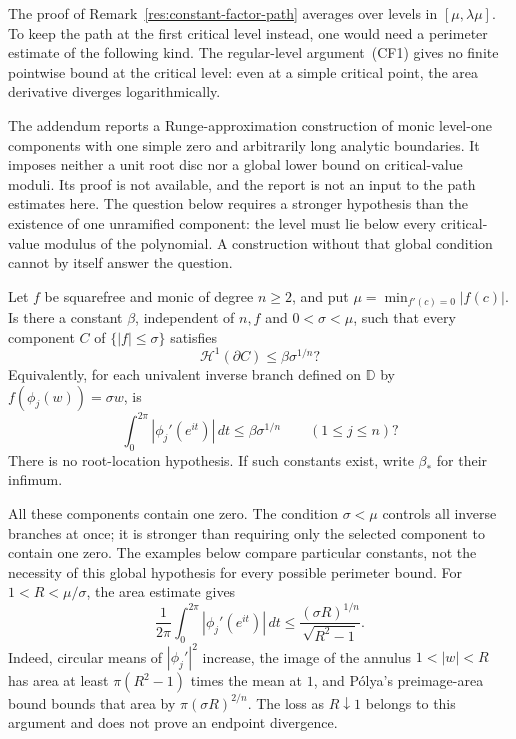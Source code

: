 \documentclass[11pt]{article}
\begin{document}
The proof of Remark~\ref{res:constant-factor-path} averages over
levels in $[\mu,\lambda\mu]$. To keep the path at the first critical
level instead, one would need a perimeter estimate of the following kind.
The regular-level argument~(CF1) gives no finite pointwise bound at the
critical level: even at a simple critical point, the area derivative
diverges logarithmically.

The addendum \cite[Proposition~2]{revision2026} reports a
Runge-approximation construction of monic level-one components with one
simple zero and arbitrarily long analytic boundaries. It imposes neither
a unit root disc nor a global lower bound on critical-value moduli.
Its proof is not available, and
the report is not an input to the path estimates here. The question below
requires a stronger hypothesis than the existence of one unramified
component: the level must lie below every critical-value modulus of the
polynomial. A construction without that global condition cannot by itself
answer the question.

\begin{problem}\label{prob:conjecture-p}
Let $f$ be squarefree and monic of degree $n\ge2$, and put
$\mu=\min_{f'(c)=0}|f(c)|$.  Is there a constant $\beta$, independent of
$n,f$ and $0<\sigma<\mu$, such that every component $C$ of
$\{|f|\le\sigma\}$ satisfies
\[
 \mathcal H^1(\partial C)\le\beta\sigma^{1/n}?
\]
Equivalently, for each univalent inverse branch defined on $\mathbb D$
by $f(\phi_j(w))=\sigma w$, is
\[
 \int_0^{2\pi}|\phi_j'(e^{it})|\,dt\le\beta\sigma^{1/n}
 \qquad(1\le j\le n)?
\]
There is no root-location hypothesis.  If such constants exist, write
$\beta_*$ for their infimum.
\end{problem}
All these components contain one zero. The condition $\sigma<\mu$
controls all inverse branches at once; it is stronger than requiring
only the selected component to contain one zero. The examples below
compare particular constants, not the necessity of this global
hypothesis for every possible perimeter bound.
For $1<R<\mu/\sigma$, the area estimate gives
\[
 \frac{1}{2\pi}\int_0^{2\pi}|\phi_j'(e^{it})|\,dt
 \le \frac{(\sigma R)^{1/n}}{\sqrt{R^2-1}}.
\]
Indeed, circular means of $|\phi_j'|^2$ increase, the image of the annulus
$1<|w|<R$ has area at least $\pi(R^2-1)$ times the mean at $1$, and
P\'olya's preimage-area bound \cite[Theorem~1]{crane} bounds that area by
$\pi(\sigma R)^{2/n}$.  The loss as $R\downarrow1$ belongs to this
argument and does not prove an endpoint divergence.
\end{document}
